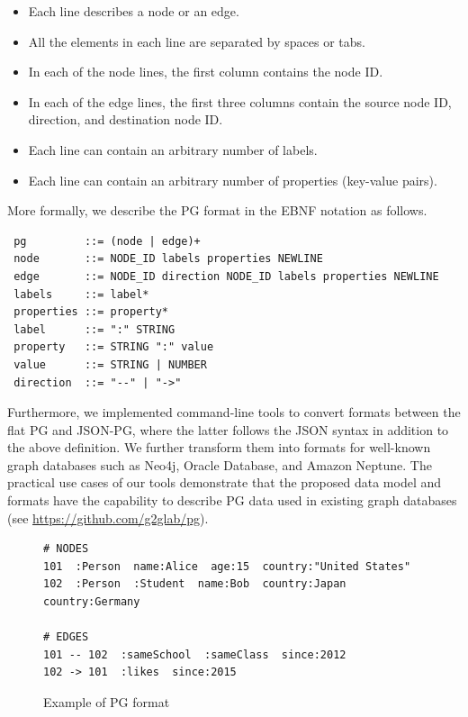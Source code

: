 \documentclass[runningheads]{llncs}
\begin{document}
\begin{itemize}
    \item Each line describes a node or an edge.
    \item All the elements in each line are separated by spaces or tabs.
    \item In each of the node lines, the first column contains the node ID.
    \item In each of the edge lines, the first three columns contain the source node ID, direction, and destination node ID.
    \item Each line can contain an arbitrary number of labels.
    \item Each line can contain an arbitrary number of properties (key-value pairs).
\end{itemize}

More formally, we describe the PG format in the EBNF notation as follows.

\begin{defi}
\leavevmode
\begin{verbatim}
 pg         ::= (node | edge)+
 node       ::= NODE_ID labels properties NEWLINE
 edge       ::= NODE_ID direction NODE_ID labels properties NEWLINE
 labels     ::= label*
 properties ::= property*
 label      ::= ":" STRING
 property   ::= STRING ":" value
 value      ::= STRING | NUMBER
 direction  ::= "--" | "->"
\end{verbatim}
\end{defi}

Furthermore, we implemented command-line tools to convert formats between the flat PG and JSON-PG, where the latter follows the JSON syntax in addition to the above definition. We further transform them into formats for well-known graph databases such as Neo4j, Oracle Database, and Amazon Neptune. The practical use cases of our tools demonstrate that the proposed data model and formats have the capability to describe PG data used in existing graph databases (see \url{https://github.com/g2glab/pg}).

\begin{figure}[!t]
\begin{scriptsize}
\begin{verbatim}
# NODES
101  :Person  name:Alice  age:15  country:"United States"
102  :Person  :Student  name:Bob  country:Japan  country:Germany

# EDGES
101 -- 102  :sameSchool  :sameClass  since:2012
102 -> 101  :likes  since:2015
\end{verbatim}
\end{scriptsize}
\caption{Example of PG format}
\label{fig:example-pg}
\end{figure}
\end{document}
